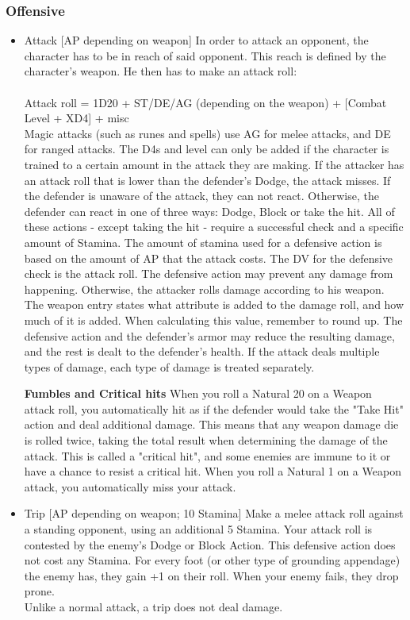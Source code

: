 \subsubsection{Offensive}
\begin{itemize}
\item Attack [AP depending on weapon]
In order to attack an opponent, the character has to be in reach of said opponent.
This reach is defined by the character's weapon.
He then has to make an attack roll:\\
\\
Attack roll = 1D20 + ST/DE/AG (depending on the weapon) + [Combat Level + XD4] + misc
\\
Magic attacks (such as runes and spells) use AG for melee attacks, and DE for ranged attacks.
The D4s and level can only be added if the character is trained to a certain amount in the attack they are making.
If the attacker has an attack roll that is lower than the defender's Dodge, the attack misses.
If the defender is unaware of the attack, they can not react.
Otherwise, the defender can react in one of three ways: Dodge, Block or take the hit.
All of these actions - except taking the hit - require a successful check and a specific amount of Stamina.
The amount of stamina used for a defensive action is based on the amount of  AP that the attack costs.
The DV for the defensive check is the attack roll.
The defensive action may prevent any damage from happening.
Otherwise, the attacker rolls damage according to his weapon.
The weapon entry states what attribute is added to the damage roll, and how much of it is added.
When calculating this value, remember to round up.
The defensive action and the defender's armor may reduce the resulting damage, and the rest is dealt to the defender's health.
If the attack deals multiple types of damage, each type of damage is treated separately.


\textbf{Fumbles and Critical hits}
When you roll a Natural 20 on a Weapon attack roll, you automatically hit as if the defender would take the "Take Hit" action and deal additional damage.
This means that any weapon damage die is rolled twice, taking the total result when determining the damage of the attack.
This is called a "critical hit", and some enemies are immune to it or have a chance to resist a critical hit.
When you roll a Natural 1 on a Weapon attack, you automatically miss your attack.


\item Trip [AP depending on weapon; 10 Stamina]
Make a melee attack roll against a standing opponent, using an additional 5 Stamina.
Your attack roll is contested by the enemy's Dodge or Block Action.
This defensive action does not cost any Stamina.
For every foot (or other type of grounding appendage) the enemy has, they gain +1 on their roll.
When your enemy fails, they drop prone.\\
Unlike a normal attack, a trip does not deal damage.\\



\end{itemize}

